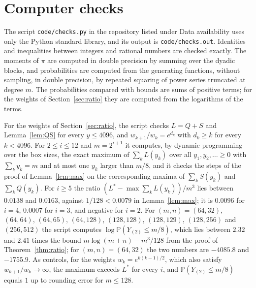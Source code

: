 \documentclass[11pt]{amsart}
\theoremstyle{remark}
\numberwithin{equation}{section}
\newcommand{\Pp}{\mathbb P}
\begin{document}
\section{Computer checks}\label{sec:checks}

The script \texttt{code/checks.py} in the repository listed under Data availability uses only the Python standard library, and its output is \texttt{code/checks.out}. Identities and inequalities between integers and rational numbers are checked exactly. The moments of $\pi$ are computed in double precision by summing over the dyadic blocks, and probabilities are computed from the generating functions, without sampling, in double precision, by repeated squaring of power series truncated at degree $m$. The probabilities compared with bounds are sums of positive terms; for the weights of Section~\ref{sec:ratio} they are computed from the logarithms of the terms.

For the weights of Section~\ref{sec:ratio}, the script checks $L=Q+S$ and Lemma~\ref{lem:QS} for every $y\le4096$, and $w_{k+1}/w_k=e^{d_k}$ with $d_k\ge k$ for every $k<4096$. For $2\le i\le12$ and $m=2^{i+1}$ it computes, by dynamic programming over the box sizes, the exact maximum of $\sum_kL(y_k)$ over all $y_1,y_2,\ldots\ge0$ with $\sum_ky_k=m$ and at most one $y_k$ larger than $m/8$, and it checks the steps of the proof of Lemma~\ref{lem:max} on the corresponding maxima of $\sum_kS(y_k)$ and $\sum_kQ(y_k)$. For $i\ge5$ the ratio $(L^*-\max\sum_kL(y_k))/m^3$ lies between $0.0138$ and $0.0163$, against $1/128<0.0079$ in Lemma~\ref{lem:max}; it is $0.0096$ for $i=4$, $0.0007$ for $i=3$, and negative for $i=2$. For $(m,n)=(64,32)$, $(64,64)$, $(64,65)$, $(64,128)$, $(128,128)$, $(128,129)$, $(128,256)$ and $(256,512)$ the script computes $\log\Pp(Y_{(2)}\le m/8)$, which lies between $2.32$ and $2.41$ times the bound $m\log(m+n)-m^3/128$ from the proof of Theorem~\ref{thm:ratio}; for $(m,n)=(64,32)$ the two numbers are $-4085.8$ and $-1755.9$. As controls, for the weights $w_k=e^{k(k-1)/2}$, which also satisfy $w_{k+1}/w_k\to\infty$, the maximum exceeds $L^*$ for every $i$, and $\Pp(Y_{(2)}\le m/8)$ equals $1$ up to rounding error for $m\le128$.
\end{document}
